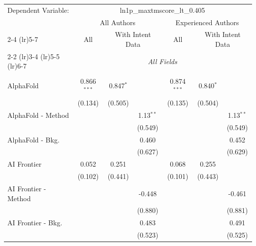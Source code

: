 \begingroup
\centering
\begin{tabular}{lcccccc}
   \tabularnewline \midrule \midrule
   Dependent Variable: & \multicolumn{6}{c}{ln1p\_maxtmscore\_lt\_0.405}\\
 & \multicolumn{3}{c}{All Authors} & \multicolumn{3}{c}{Experienced Authors} \\
\cmidrule(lr){2-4} \cmidrule(lr){5-7}
 & \multicolumn{1}{c}{All} & \multicolumn{2}{c}{With Intent Data} & \multicolumn{1}{c}{All} & \multicolumn{2}{c}{With Intent Data} \\
\cmidrule(lr){2-2} \cmidrule(lr){3-4} \cmidrule(lr){5-5} \cmidrule(lr){6-7}
 & \multicolumn{6}{c}{\textit{All Fields}} \\ \\
   AlphaFold            & 0.866$^{***}$ & 0.847$^{*}$  &             & 0.874$^{***}$ & 0.840$^{*}$  &   \\   
                        & (0.134)       & (0.505)      &             & (0.135)       & (0.504)      &   \\   
   AlphaFold - Method   &               &              & 1.13$^{**}$ &               &              & 1.13$^{**}$\\   
                        &               &              & (0.549)     &               &              & (0.549)\\   
   AlphaFold - Bkg.     &               &              & 0.460       &               &              & 0.452\\   
                        &               &              & (0.627)     &               &              & (0.629)\\   
   AI Frontier          & 0.052         & 0.251        &             & 0.068         & 0.255        &   \\   
                        & (0.102)       & (0.441)      &             & (0.101)       & (0.443)      &   \\   
   AI Frontier - Method &               &              & -0.448      &               &              & -0.461\\   
                        &               &              & (0.880)     &               &              & (0.881)\\   
   AI Frontier - Bkg.   &               &              & 0.483       &               &              & 0.491\\   
                        &               &              & (0.523)     &               &              & (0.525)\\   

\end{tabular}
